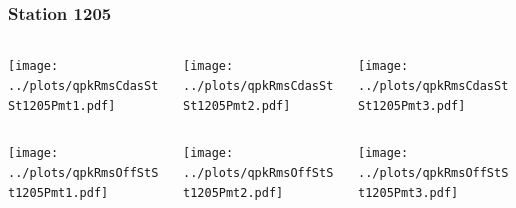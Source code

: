 \documentclass[aspectratio=169]{beamer}
\begin{document}
\begin{frame} 
  \frametitle{Station 1205}
  \begin{center}
    \begin{columns}
      \begin{column}{0.33\textwidth}
        \texttt{[image: ../plots/qpkRmsCdasStSt1205Pmt1.pdf]}
      \end{column}
      \begin{column}{0.33\textwidth}
        \texttt{[image: ../plots/qpkRmsCdasStSt1205Pmt2.pdf]}
      \end{column}
      \begin{column}{0.33\textwidth}
        \texttt{[image: ../plots/qpkRmsCdasStSt1205Pmt3.pdf]}
      \end{column}
    \end{columns}
  \end{center}

  \begin{center}
    \begin{columns}
      \begin{column}{0.33\textwidth}
        \texttt{[image: ../plots/qpkRmsOffStSt1205Pmt1.pdf]}
      \end{column}
      \begin{column}{0.33\textwidth}
        \texttt{[image: ../plots/qpkRmsOffStSt1205Pmt2.pdf]}
      \end{column}
      \begin{column}{0.33\textwidth}
        \texttt{[image: ../plots/qpkRmsOffStSt1205Pmt3.pdf]}
      \end{column}
    \end{columns}
  \end{center}
\end{frame}
\end{document}
